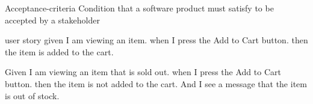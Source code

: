 Acceptance-criteria 
  Condition that a software product must satisfy to be accepted by a stakeholder 

user story  
  given I am viewing an item.
  when I press the Add to Cart button.
  then the item is added to the cart.


  Given I am viewing an item that is sold out.
  when I press the Add to Cart button.
  then the item is not added to the cart. 
  And I see a message that the item is out of stock. 